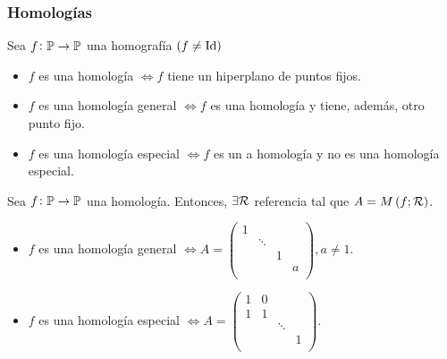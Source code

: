 
\subsubsection{Homologías}

\begin{defi}
    Sea $f \colon \mathbb{P} \to \mathbb{P}$ una homografía $\left( f \neq \operatorname{Id} \right)$
    \begin{itemize}
        \item $f$ es una homología $\iff f$ tiene un hiperplano de puntos fijos.
        \item $f$ es una homología general $\iff f$ es una homología y tiene, además, otro punto fijo.
        \item $f$ es una homología especial $\iff f$ es un a homología y no es una homología especial.
    \end{itemize}
\end{defi}

\begin{prop}
    Sea $f \colon \mathbb{P} \to \mathbb{P}$ una homología. Entonces, $\exists \mathcal{R}$ referencia tal que $A=M\left( f ; \mathcal{R} \right)$.
    \begin{itemize}
        \item $f$ es una homología general $ \iff A=
            \begin{pmatrix}
                1 & & & \\
                & \ddots & & \\
                & & 1 & \\
                & & & a \\
            \end{pmatrix}, a \neq 1.$
        \item $f$ es una homología especial $ \iff A=
            \begin{pmatrix}
                1 & 0 & & \\
                1 & 1 & & \\
                & & \ddots &  \\
                & & & 1 \\
            \end{pmatrix}.$
    \end{itemize}
\end{prop}

